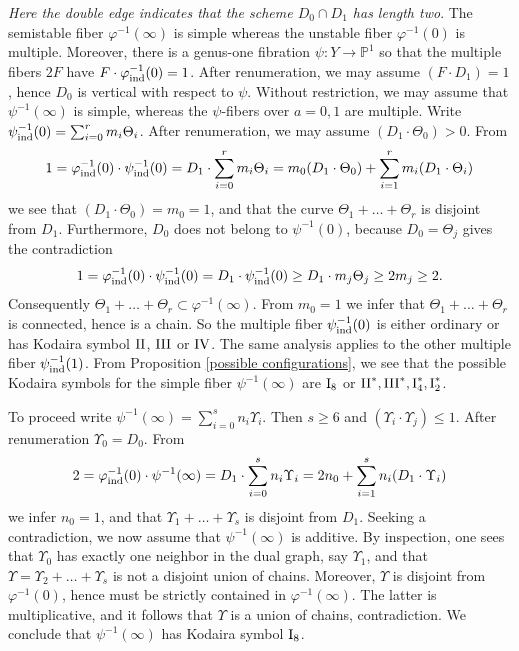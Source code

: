 \documentclass[oneside, 12pt]{amsart}
\theoremstyle{definition}
\theoremstyle{remark}
\newcommand{\PP}{\mathbb{P}}
\newcommand{\I}{\text{\rm I}}
\newcommand{\II}{\text{\rm II}}
\newcommand{\III}{\text{\rm III}}
\newcommand{\IV}{\text{\rm IV}}
\newcommand{\ra}{\rightarrow}
\newcommand{\ind}{\text{\rm ind}}
\newcommand{\inv}{{-1}}
\begin{document}
\emph{Here the double edge indicates that the   scheme $D_0\cap D_1$ has length two}.
The semistable fiber $\varphi^{-1}(\infty)$  is simple whereas the unstable fiber $\varphi^{-1}(0)$  is multiple.
Moreover,  there is a genus-one fibration $\psi:Y\ra\PP^1$ so that the multiple fibers $2F$ have  
$F\cdot \varphi^\inv_\ind(0)=1$. 
After renumeration, we may assume   $(F\cdot D_1)=1$, hence $D_0$ is vertical with respect to $\psi$.
Without restriction, we may assume that $\psi^\inv(\infty)$ is simple, whereas the $\psi$-fibers over $a=0,1$ are multiple.
Write $\psi^\inv_\ind(0)=\sum_{i=0}^r m_i \Theta_i$. After renumeration, we may assume $(D_1\cdot \Theta_0)>0$.
From
$$
1=\varphi^\inv_\ind(0)\cdot\psi^\inv_\ind(0) = D_1\cdot \sum_{i=0}^rm_i\Theta_i = m_0(D_1\cdot\Theta_0) + \sum_{i=1}^r m_i(D_1\cdot\Theta_i)
$$
we see that $(D_1\cdot\Theta_0)=m_0=1$, and that the curve $\Theta_1+\ldots+\Theta_r$  is disjoint from $D_1$.
Furthermore, $D_0$ does not belong to $\psi^\inv(0)$, because   $D_0=\Theta_j$ gives the contradiction
$$
1=\varphi^\inv_\ind(0)\cdot\psi^\inv_\ind(0) = D_1\cdot\psi^\inv_\ind(0)\geq D_1\cdot m_j\Theta_j\geq 2m_j\geq 2.
$$
Consequently $\Theta_1+\ldots+\Theta_r\subset\varphi^{-1}(\infty)$.
From $m_0=1$ we infer that  $\Theta_1+\ldots+\Theta_r$ is connected, hence is a chain. So the multiple fiber $\psi^\inv_\ind(0)$ is either
ordinary or has Kodaira symbol $\II$, $\III$ or $\IV$.
The same analysis applies to the other multiple fiber $\psi^\inv_\ind(1)$.
From Proposition \ref{possible configurations}, we see that the possible Kodaira symbols for  the simple fiber $\psi^\inv(\infty)$
are $\I_8$ or $\II^*, \III^*, \I_4^*, \I_2^*$.

To proceed write  $\psi^\inv(\infty)=\sum_{i=0}^s n_i\Upsilon_i$. Then $s\geq 6$ and  $(\Upsilon_i\cdot\Upsilon_j)\leq 1$. After renumeration $\Upsilon_0=D_0$. From
$$
2=\varphi^\inv_\ind(0)\cdot\psi^\inv(\infty) = D_1\cdot\sum_{i=0}^s n_i\Upsilon_i = 2n_0 + \sum_{i=1}^s n_i(D_1\cdot\Upsilon_i)
$$
we infer $n_0=1$, and that $\Upsilon_1+\ldots+\Upsilon_s$ is disjoint from $D_1$.
Seeking a contradiction, we now assume that $\psi^{-1}(\infty)$ is additive. By inspection, one sees that  $\Upsilon_0$ has exactly one neighbor in the dual graph,
say $\Upsilon_1$, and  that $\Upsilon=\Upsilon_2+\ldots+\Upsilon_s$ is not a disjoint union of chains.
Moreover, $\Upsilon$ is disjoint from $\varphi^{-1}(0)$, hence must be strictly 
contained in $\varphi^\inv(\infty)$. The latter is multiplicative, and it follows that $\Upsilon$ is a union of chains, contradiction.
We conclude that $\psi^\inv(\infty)$ has Kodaira symbol $\I_8$.
\end{document}
